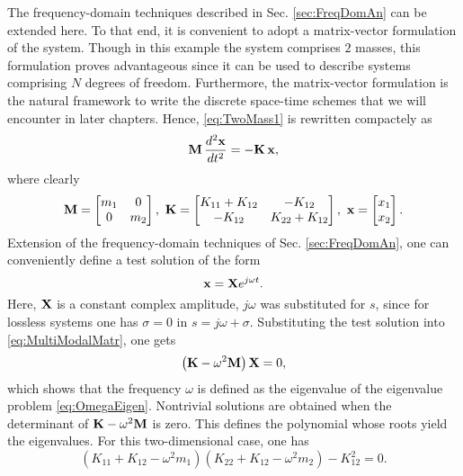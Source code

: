 The frequency-domain techniques described in Sec. \ref{sec:FreqDomAn} can be extended here. To that end, it is convenient to adopt a matrix-vector formulation of the system. Though in this example the system comprises $2$ masses, this formulation proves advantageous since it can be used to describe systems comprising $N$ degrees of freedom. Furthermore, the matrix-vector formulation is the natural framework to write the discrete space-time schemes that we will encounter in later chapters. Hence, \eqref{eq:TwoMass1} is rewritten compactely as
\begin{equation}\label{eq:MultiModalMatr}
{\bf M} \, \frac{d^2{\bf x}}{dt^2} = -{\bf K} \, {\bf x}, 
\end{equation}
where clearly
\begin{equation}
{\bf M} = \begin{bmatrix}m_1 & 0 \\ 0 & m_2 \end{bmatrix}, \,\, {\bf K} = \begin{bmatrix}K_{11}+K_{12} & -K_{12} \\ -K_{12} & K_{22}+K_{12} \end{bmatrix}, \,\, {\bf x} = \begin{bmatrix}x_1  \\  x_2 \end{bmatrix}.
\end{equation}
Extension of the frequency-domain techniques of Sec. \ref{sec:FreqDomAn}, one can conveniently define a test solution of the form
\begin{equation}
{\bf x} =  {\bf X} e^{j\omega t}.
\end{equation}
Here, $ {\bf X}$ is a constant complex amplitude, $j\omega$ was substituted for $s$, since for lossless systems one has $\sigma = 0$ in $s = j\omega + \sigma$. Substituting the test solution into \eqref{eq:MultiModalMatr}, one gets
\begin{equation}\label{eq:OmegaEigen}
\left( {\bf K } - \omega^2 {\bf M} \right)  {\bf X} = 0,
\end{equation}
which shows that the frequency $\omega$ is defined as the eigenvalue of the  eigenvalue problem \eqref{eq:OmegaEigen}. Nontrivial solutions are obtained when the determinant of ${\bf K } - \omega^2 {\bf M}$ is zero. This defines the polynomial whose roots yield the eigenvalues. For this two-dimensional case, one has
\begin{equation}
 (K_{11}+K_{12} - \omega^2 m_1)(K_{22}+K_{12} - \omega^2 m_2) - K_{12}^2 = 0.
\end{equation}
